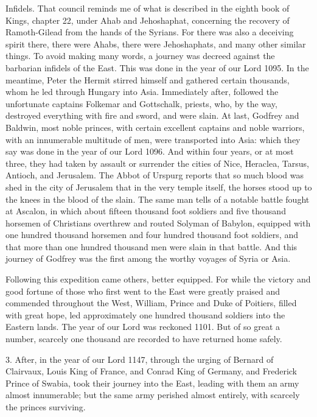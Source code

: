 Infidels. That council reminds me of what is described in the eighth book of Kings, chapter 22, under Ahab and Jehoshaphat, concerning the recovery of Ramoth-Gilead from the hands of the Syrians. For there was also a deceiving spirit there, there were Ahabs, there were Jehoshaphats, and many other similar things. To avoid making many words, a journey was decreed against the barbarian infidels of the East. This was done in the year of our Lord 1095. In the meantime, Peter the Hermit stirred himself and gathered certain thousands, whom he led through Hungary into Asia. Immediately after, followed the unfortunate captains Folkemar and Gottschalk, priests, who, by the way, destroyed everything with fire and sword, and were slain. At last, Godfrey and Baldwin, most noble princes, with certain excellent captains and noble warriors, with an innumerable multitude of men, were transported into Asia: which they say was done in the year of our Lord 1096. And within four years, or at most three, they had taken by assault or surrender the cities of Nice, Heraclea, Tarsus, Antioch, and Jerusalem. The Abbot of Urspurg reports that so much blood was shed in the city of Jerusalem that in the very temple itself, the horses stood up to the knees in the blood of the slain. The same man tells of a notable battle fought at Ascalon, in which about fifteen thousand foot soldiers and five thousand horsemen of Christians overthrew and routed Solyman of Babylon, equipped with one hundred thousand horsemen and four hundred thousand foot soldiers, and that more than one hundred thousand men were slain in that battle. And this journey of Godfrey was the first among the worthy voyages of Syria or Asia.

Following this expedition came others, better equipped. For while the victory and good fortune of those who first went to the East were greatly praised and commended throughout the West, William, Prince and Duke of Poitiers, filled with great hope, led approximately one hundred thousand soldiers into the Eastern lands. The year of our Lord was reckoned 1101. But of so great a number, scarcely one thousand are recorded to have returned home safely.

3. After, in the year of our Lord 1147, through the urging of Bernard of Clairvaux, Louis King of France, and Conrad King of Germany, and Frederick Prince of Swabia, took their journey into the East, leading with them an army almost innumerable; but the same army perished almost entirely, with scarcely the princes surviving.

